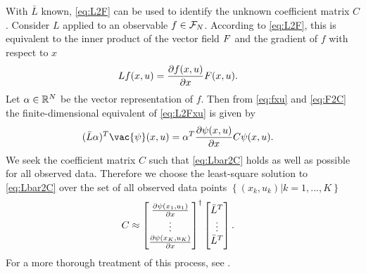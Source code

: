 With $\bar{L}$ known, \eqref{eq:L2F} can be used to identify the unknown coefficient matrix $C$.
Consider $L$ applied to an observable $f \in \mathcal{F}_N$.
According to \eqref{eq:L2F}, this is equivalent to the inner product of the vector field $F$ and the gradient of $f$ with respect to $x$  
\begin{align}
    L f(x,u) &= \frac{\partial f(x,u)}{\partial x} F(x,u).
    \label{eq:L2Fxu}
\end{align}
Let $\alpha \in \mathbb{R}^N$ be the vector representation of $f$.
Then from \eqref{eq:fxu} and \eqref{eq:F2C} the finite-dimensional equivalent of \eqref{eq:L2Fxu} is given by
\begin{align}
    (\bar{L} {\alpha})^T \vac{\psi}(\xv,\uv) &= {\alpha}^T \frac{\partial \psi(\xv, \uv)}{\partial \xv} C {\psi}(\xv,\uv).
    \label{eq:Lbar2C}
\end{align}
We seek the coefficient matrix $C$ such that \eqref{eq:Lbar2C} holds as well as possible for all observed data.
Therefore we choose the least-square solution to \eqref{eq:Lbar2C} over the set of all observed data points $\left\{ (x_k,u_k) | k = 1,...,K \right\}$
\begin{align}
    C &\approx \begin{bmatrix}  \frac{\partial \psi(x_1, u_1)}{\partial x} \\ \vdots \\ \frac{\partial \psi(x_K, u_K)}{\partial x}  \end{bmatrix}^\dagger
        \begin{bmatrix}  \bar{L}^T \\ \vdots \\ \bar{L}^T  \end{bmatrix}.
\end{align}
For a more thorough treatment of this process, see \cite{mauroy2016linear, mauroy2017koopman}.



